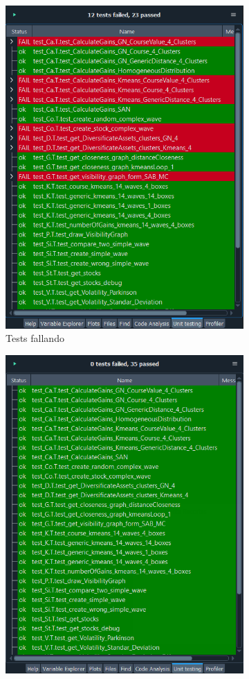 \documentclass[12pt,a4paper]{article}
\begin{document}
\begin{figure}[H]
\centering
\begin{subfigure}{.5\textwidth}
  \centering
  \includegraphics[width=.9\linewidth]{tests}
  \caption{Tests fallando}
  \label{fig:sub1}
\end{subfigure}%
\begin{subfigure}{.5\textwidth}
  \centering
  \includegraphics[width=.9\linewidth]{tests bien}

\end{subfigure}
\end{figure}
\end{document}
